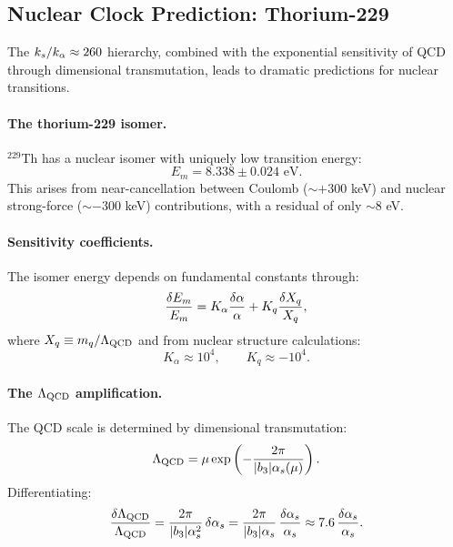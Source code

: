 \subsection{Nuclear Clock Prediction: Thorium-229}\label{sec:gauge-nuclear}

The $k_s/k_\alpha \approx 260$ hierarchy, combined with the exponential sensitivity of QCD through dimensional transmutation, leads to dramatic predictions for nuclear transitions.

\paragraph{The thorium-229 isomer.}
$^{229}$Th has a nuclear isomer with uniquely low transition energy:
\begin{equation}
E_m = 8.338 \pm 0.024 \text{ eV}.
\end{equation}
This arises from near-cancellation between Coulomb ($\sim +300$ keV) and nuclear strong-force ($\sim -300$ keV) contributions, with a residual of only $\sim 8$ eV.

\paragraph{Sensitivity coefficients.}
The isomer energy depends on fundamental constants through:
\begin{equation}\label{eq:Em-sensitivity}
\frac{\delta E_m}{E_m} = K_\alpha\frac{\delta\alpha}{\alpha} + K_q\frac{\delta X_q}{X_q},
\end{equation}
where $X_q \equiv m_q/\Lambda_{\rm QCD}$ and from nuclear structure calculations:
\begin{equation}
K_\alpha \approx 10^4, \qquad K_q \approx -10^4.
\end{equation}

\paragraph{The $\Lambda_{\rm QCD}$ amplification.}
The QCD scale is determined by dimensional transmutation:
\begin{equation}
\Lambda_{\rm QCD} = \mu\exp\left(-\frac{2\pi}{|b_3|\alpha_s(\mu)}\right).
\end{equation}
Differentiating:
\begin{equation}\label{eq:LQCD-sensitivity}
\frac{\delta\Lambda_{\rm QCD}}{\Lambda_{\rm QCD}} = \frac{2\pi}{|b_3|\alpha_s^2}\,\delta\alpha_s = \frac{2\pi}{|b_3|\alpha_s}\,\frac{\delta\alpha_s}{\alpha_s} \approx 7.6\,\frac{\delta\alpha_s}{\alpha_s}.
\end{equation}

